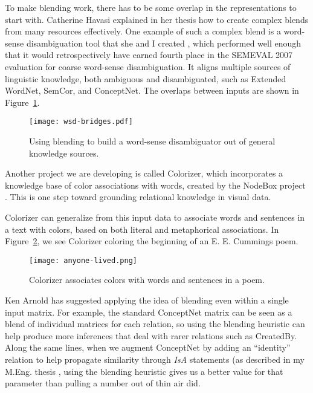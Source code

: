 \documentclass[11pt]{article}
\begin{document}
To make blending work, there has to be some overlap in the representations to
start with. Catherine Havasi explained in her thesis how to create complex
blends from many resources effectively. One example of such a complex blend is
a word-sense disambiguation tool that she and I created \cite{havasi-thesis},
which performed well enough that it would retrospectively have earned fourth
place in the SEMEVAL 2007 evaluation for coarse word-sense disambiguation. It
aligns multiple sources of linguistic knowledge, both ambiguous and
disambiguated, such as Extended WordNet, SemCor, and ConceptNet. The overlaps
between inputs are shown in Figure~\ref{wsd-bridges}.

\begin{figure}[h]
\begin{center}
\texttt{[image: wsd-bridges.pdf]}
\end{center}
\vspace{-2em}
\caption{Using blending to build a word-sense disambiguator out of general knowledge sources.}
\label{wsd-bridges}
\end{figure}

Another project we are developing is called Colorizer, which incorporates a knowledge base of color associations with words, created by the NodeBox project \cite{nodebox}.  This is one step toward grounding relational knowledge in visual data.

Colorizer can generalize from this input data to associate words and sentences in a text with colors, based on both literal and metaphorical associations. In Figure~\ref{anyone-lived}, we see Colorizer coloring the beginning of an E. E. Cummings poem.

\begin{figure}[h]
\begin{center}
\texttt{[image: anyone-lived.png]}
\end{center}
\vspace{-2em}
\caption{Colorizer associates colors with words and sentences in a poem.}
\label{anyone-lived}
\end{figure}

Ken Arnold has suggested applying the idea of blending even within a single
input matrix. For example, the standard ConceptNet matrix can be seen as a
blend of individual matrices for each relation, so using the blending heuristic
can help produce more inferences that deal with rarer relations such as
CreatedBy. Along the same lines, when we augment ConceptNet by adding an
``identity'' relation to help propagate similarity through {\em IsA} statements
(as described in my M.Eng.  thesis \cite{robthesis}, using the blending
heuristic gives us a better value for that parameter than pulling a number out
of thin air did.
\label{sec:identity}
\end{document}

